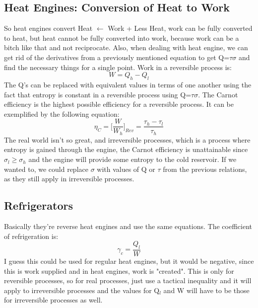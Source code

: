 \documentclass[arial]{article}
\begin{document}
\subsection*{Heat Engines: Conversion of Heat to Work}
So heat engines convert Heat $\leftarrow$ Work + Less Heat, work can be fully converted to heat, but heat cannot be fully converted into work, because work can be a bitch like that and not reciprocate. Also, when dealing with heat engine, we can get rid of the derivatives from a previously mentioned equation to get Q=$\tau \sigma$ and find the necessary things for a single point. Work in a reversible process is:
\begin{equation}
W=Q_h-Q_l
\end{equation}
The Q's can be replaced with equivalent values in terms of one another using the fact that entropy is constant in a reversible process using Q=$\tau \sigma$. The Carnot efficiency is the highest possible efficiency for a reversible process. It can be exemplified by the following equation:
\begin{equation}
\eta_C=\bigg[\frac{W}{W_h}\bigg]_{Rev}=\frac{\tau_h-\tau_l}{\tau_h}
\end{equation}
The real world isn't so great, and irreversible processes, which is a process where entropy is gained through the engine, the Carnot efficiency is unattainable since $\sigma_l\geq\sigma_h$ and the engine will provide some entropy to the cold reservoir. If we wanted to, we could replace $\sigma$ with values of Q or $\tau$ from the previous relations, as they still apply in irreversible processes. 

\subsection*{Refrigerators}
Basically they're reverse heat engines and use the same equations. The coefficient of refrigeration is:
\begin{equation}
\gamma_c =\frac{Q_l}{W}
\end{equation}
I guess this could be used for regular heat engines, but it would be negative, since this is work supplied and in heat engines, work is "created". This is only for reversible processes, so for real processes, just use a tactical inequality and it will apply to irreversible processes and the values for Q$_l$ and W will have to be those for irreversible processes as well.
\end{document}
